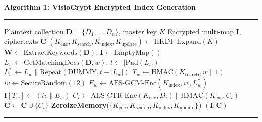 \documentclass[preview,varwidth=88mm]{standalone}
\begin{document}
\noindent\textbf{Algorithm 1: VisioCrypt Encrypted Index Generation}
\vspace{1mm}\hrule\vspace{1mm}
\begin{algorithmic}[1]
\Require Plaintext collection $\mathbf{D} = \{D_1, \dots, D_n\}$, master key $K$
\Ensure Encrypted multi-map $\mathbf{I}$, ciphertexts $\mathbf{C}$
\State $(K_{\text{enc}}, K_{\text{search}}, K_{\text{index}}, K_{\text{update}}) \leftarrow \text{HKDF-Expand}(K)$
\State $\mathbf{W} \leftarrow \text{ExtractKeywords}(\mathbf{D})$, $\mathbf{I} \leftarrow \text{EmptyMap}()$
    \State $L_w \leftarrow \text{GetMatchingDocs}(\mathbf{D}, w)$, $t \leftarrow |\text{Pad}(L_w)|$
    \State $L_w^* \leftarrow L_w \parallel \text{Repeat}(\text{DUMMY}, t - |L_w|)$
    \State $T_w \leftarrow \text{HMAC}(K_{\text{search}}, w \parallel 1)$
    \State $iv \leftarrow \text{SecureRandom}(12)$
    \State $E_w \leftarrow \text{AES-GCM-Enc}(K_{\text{index}}, iv, L_w^*)$
    \State $\mathbf{I}[T_w] \leftarrow (iv \parallel E_w)$
\EndFor
{}
    \State $C_i \leftarrow \text{AES-CTR-Enc}(K_{\text{enc}}, D_i) \parallel \text{HMAC}(K_{\text{enc}}, C_i)$
    \State $\mathbf{C} \leftarrow \mathbf{C} \cup \{C_i\}$
\EndFor
\State \textbf{ZeroizeMemory}($\{K_{\text{enc}}, K_{\text{search}}, K_{\text{index}}, K_{\text{update}}\}$)
\State \Return $(\mathbf{I}, \mathbf{C})$
\end{algorithmic}
\vspace{1mm}\hrule
\end{document}
